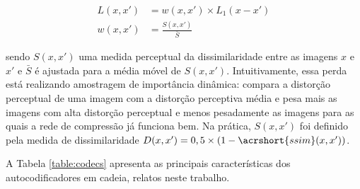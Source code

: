 \begin{equation}
\label{eq:loss}     
\begin{aligned}
L(x,x') &= w(x,x') \times L_1(x-x') \\ 
w(x,x') &= \frac{S(x,x')}{\bar{S}} 
\end{aligned}
\end{equation}

\noindent sendo $S(x, x')$ uma medida perceptual da dissimilaridade entre as imagens $x$ e $x'$ e $\bar{S}$ é ajustada para a média móvel de $S(x,x')$. 
Intuitivamente, essa perda está realizando amostragem de importância dinâmica: compara a distorção perceptual de uma imagem com a distorção perceptiva média e pesa mais as imagens com alta distorção perceptual e menos pesadamente as imagens para as quais a rede de compressão já funciona bem. Na prática, $S(x, x')$ foi definido pela medida de dissimilaridade $D(x, x') = 0,5 \times (1- \acrshort{ssim} (x, x'))$.  

A Tabela \ref{table:codecs} apresenta as principais características dos autocodificadores em cadeia, relatos neste trabalho.  


